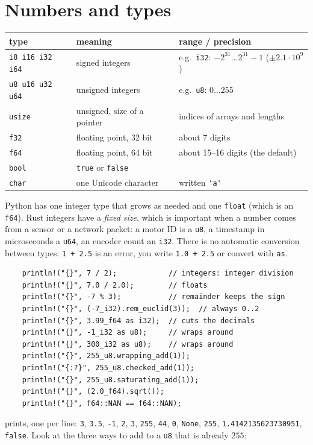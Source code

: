 \section*{Numbers and types}
\begin{center}
\renewcommand{\arraystretch}{1.2}
\begin{tabular}{lll}
\textbf{type} & \textbf{meaning} & \textbf{range / precision}\\ \hline
\verb!i8 i16 i32 i64! & signed integers & e.g.\ \verb!i32!: $-2^{31}\dots2^{31}-1$ ($\pm2.1\cdot10^9$)\\
\verb!u8 u16 u32 u64! & unsigned integers & e.g.\ \verb!u8!: $0\dots255$\\
\verb!usize! & unsigned, size of a pointer & indices of arrays and lengths\\
\verb!f32! & floating point, 32 bit & about 7 digits\\
\verb!f64! & floating point, 64 bit & about 15--16 digits (the default)\\
\verb!bool! & \verb!true! or \verb!false! & \\
\verb!char! & one Unicode character & written \verb!'a'!\\
\end{tabular}
\end{center}
Python has one integer type that grows as needed and one \verb!float! (which is an \verb!f64!). Rust integers have a \emph{fixed size}, which is important when a number comes from a sensor or a network packet: a motor ID is a \verb!u8!, a timestamp in microseconds a \verb!u64!, an encoder count an \verb!i32!. There is no automatic conversion between types: \verb!1 + 2.5! is an error, you write \verb!1.0 + 2.5! or convert with \verb!as!.
\begin{verbatim}
    println!("{}", 7 / 2);            // integers: integer division
    println!("{}", 7.0 / 2.0);        // floats
    println!("{}", -7 % 3);           // remainder keeps the sign
    println!("{}", (-7_i32).rem_euclid(3));  // always 0..2
    println!("{}", 3.99_f64 as i32);  // cuts the decimals
    println!("{}", -1_i32 as u8);     // wraps around
    println!("{}", 300_i32 as u8);    // wraps around
    println!("{}", 255_u8.wrapping_add(1));
    println!("{:?}", 255_u8.checked_add(1));
    println!("{}", 255_u8.saturating_add(1));
    println!("{}", (2.0_f64).sqrt());
    println!("{}", f64::NAN == f64::NAN);
\end{verbatim}
prints, one per line: \verb!3!, \verb!3.5!, \verb!-1!, \verb!2!, \verb!3!, \verb!255!, \verb!44!, \verb!0!, \verb!None!, \verb!255!, \verb!1.4142135623730951!, \verb!false!. Look at the three ways to add to a \verb!u8! that is already $255$:
